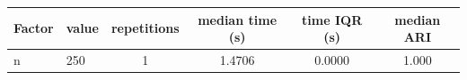 \begin{tabular}{llcccc}
\toprule
Factor & value & repetitions & median time (s) & time IQR (s) & median ARI \\
\midrule
n & 250 & 1 & 1.4706 & 0.0000 & 1.000 \\
\bottomrule
\end{tabular}
